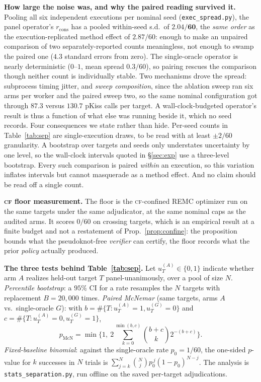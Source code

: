 \documentclass[11pt]{article}
\newcommand{\CF}{\textsc{cf}}
\begin{document}
\smallskip\noindent\textbf{How large the noise was, and why the paired reading survived it.} Pooling all six
independent executions per nominal seed (\texttt{exec\_spread.py}), the panel operator's $r_{\mathrm{cons}}$ has
a pooled within-seed s.d.\ of $\mathbf{2.04/60}$, the \emph{same order} as the execution-replicated method
effect of $2.87/60$: enough to make an unpaired comparison of two separately-reported counts meaningless, not
enough to swamp the paired one ($4.3$ standard errors from zero). The single-oracle operator is nearly deterministic ($0$--$1$, mean spread $0.3/60$), so pairing rescues the comparison though neither count is
individually stable. Two mechanisms drove the spread: subprocess timing jitter, and \emph{sweep composition},
since the ablation sweep ran six arms per worker and the paired sweep two, so the same nominal configuration got
through $87.3$ versus $130.7$ pKiss calls per target. A wall-clock-budgeted operator's result is thus a function
of what else was running beside it, which no seed records. Four consequences we state rather than hide.
Per-seed counts in Table~\ref{tab:sep} are single-execution draws, to be read with at least $\pm2/60$
granularity. A bootstrap over targets and seeds only understates uncertainty by one level, so the wall-clock
intervals quoted in \S\ref{sec:exp} use a three-level bootstrap. Every such comparison is paired \emph{within}
an execution, so this variation inflates intervals but cannot masquerade as a method effect. And no claim should
be read off a single count.

\smallskip\noindent\textbf{\CF{} floor measurement.} The floor is the \CF-confined REMC optimizer run on the
same targets under the same adjudicator, at the same nominal caps as the audited arms. It scores $0/60$ on
crossing targets, which is an empirical result at a finite budget and not a restatement of
Prop.~\ref{prop:confine}: the proposition bounds what the pseudoknot-free \emph{verifier} can certify, the
floor records what the prior \emph{policy} actually produced.

\smallskip\noindent\textbf{The three tests behind Table~\ref{tab:sep}.} Let $u^{(A)}_T\in\{0,1\}$ indicate
whether arm $A$ realizes held-out target $T$ panel-unanimously, over a pool of size $N$. \emph{Percentile
bootstrap}: a $95\%$ CI for a rate resamples the $N$ targets with replacement $B{=}20{,}000$ times.
\emph{Paired McNemar} (same targets, arms $A$ vs.\ single-oracle $G$): with
$b=\#\{T:u^{(A)}_T{=}1,u^{(G)}_T{=}0\}$ and $c=\#\{T:u^{(A)}_T{=}0,u^{(G)}_T{=}1\}$,
\begin{equation}\label{eq:mcnemar}
  p_{\mathrm{McN}}=\min\!\Big\{1,\ 2\!\!\sum_{k=0}^{\min(b,c)}\!\binom{b+c}{k}2^{-(b+c)}\Big\} .
\end{equation}
\emph{Fixed-baseline binomial}: against the single-oracle rate $p_0{=}1/60$, the one-sided $p$-value for $k$ successes
in $N$ trials is $\sum_{j=k}^{N}\binom{N}{j}p_0^{\,j}(1-p_0)^{N-j}$. The analysis is
\texttt{stats\_separation.py}, run offline on the saved per-target adjudications.
\end{document}
